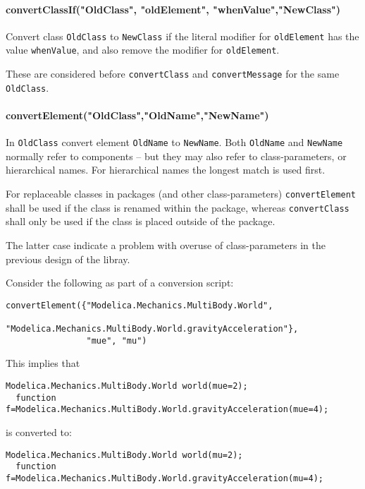 \paragraph*{convertClassIf("OldClass", "oldElement", "whenValue","NewClass")}

Convert class \lstinline!OldClass! to \lstinline!NewClass! if the literal modifier for
\lstinline!oldElement! has the value \lstinline!whenValue!, and also remove the modifier for
\lstinline!oldElement!.

These are considered before \lstinline!convertClass! and \lstinline!convertMessage! for the same
\lstinline!OldClass!.

\paragraph*{convertElement("OldClass","OldName","NewName")}

In \lstinline!OldClass! convert element \lstinline!OldName! to \lstinline!NewName!.
Both \lstinline!OldName! and \lstinline!NewName!
normally refer to components -- but they may also refer to
class-parameters, or hierarchical names. For hierarchical names the
longest match is used first.

For replaceable classes in packages (and other class-parameters) \lstinline!convertElement! shall
be used if the class is renamed within the package, whereas \lstinline!convertClass! shall only be used if the class
is placed outside of the package.
\begin{nonnormative}
The latter case indicate a problem with overuse of class-parameters in the previous design of the libray.
\end{nonnormative}

\begin{example}
Consider the following as part of a conversion script:
\begin{lstlisting}[language=modelica]
convertElement({"Modelica.Mechanics.MultiBody.World",
                "Modelica.Mechanics.MultiBody.World.gravityAcceleration"},
                "mue", "mu")
\end{lstlisting}
This implies that
\begin{lstlisting}[language=modelica]
  Modelica.Mechanics.MultiBody.World world(mue=2);
  function f=Modelica.Mechanics.MultiBody.World.gravityAcceleration(mue=4);
\end{lstlisting}
is converted to:
\begin{lstlisting}[language=modelica]
  Modelica.Mechanics.MultiBody.World world(mu=2);
  function f=Modelica.Mechanics.MultiBody.World.gravityAcceleration(mu=4);
\end{lstlisting}
\end{example}

